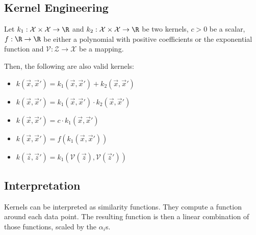 \subsection{Kernel Engineering}
Let $k_1 : \mathcal{X} \times \mathcal{X} \to \R$
and $k_2 : \mathcal{X} \times \mathcal{X} \to \R$
be two kernels,
$c > 0$ be a scalar,
$f : \R \to \R$
be either a polynomial with positive coefficients or the
exponential function and
$\mathcal{V} : \mathcal{Z} \to \mathcal{X}$ be a mapping.

Then, the following are also valid kernels:
\begin{itemize}
    \item $k(\vec{x}, \vec{x}') = k_1(\vec{x}, \vec{x}') + k_2(\vec{x}, \vec{x}')$
    \item $k(\vec{x}, \vec{x}') = k_1(\vec{x}, \vec{x}') \cdot k_2(\vec{x}, \vec{x}')$
    \item $k(\vec{x}, \vec{x}') = c \cdot k_1(\vec{x}, \vec{x}')$
    \item $k(\vec{x}, \vec{x}') = f(k_1(\vec{x}, \vec{x}'))$
    \item $k(\vec{z}, \vec{z}') = k_1(\mathcal{V}(\vec{z}), \mathcal{V}(\vec{z}'))$
\end{itemize}


\subsection{Interpretation}
Kernels can be interpreted as similarity functions.
They compute a function around each data point.
The resulting function is then a linear combination of
those functions, scaled by the $\alpha_i$s.
